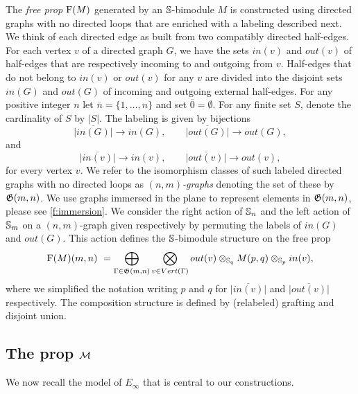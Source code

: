 The \textit{free prop} $\free(M)$ generated by an $\S$-bimodule $M$ is constructed using directed graphs with no directed loops that are enriched with a labeling described next.
We think of each directed edge as built from two compatibly directed half-edges.
For each vertex $v$ of a directed graph $G$, we have the sets $in(v)$ and $out(v)$ of half-edges that are respectively incoming to and outgoing from $v$.
Half-edges that do not belong to $in(v)$ or $out(v)$ for any $v$ are divided into the disjoint sets $in(G)$ and $out(G)$ of incoming and outgoing external half-edges.
For any positive integer $n$ let $\overline{n} = \{1, \dots, n\}$ and set $\overline{0} = \emptyset$.
For any finite set $S$, denote the cardinality of $S$ by $|S|$.
The labeling is given by bijections
\[
\overline{|in(G)|}\to in(G), \qquad
\overline{|out(G)|}\to out(G),
\]
and
\[
\overline{|in(v)|}\to in(v), \qquad
\overline{|out(v)|}\to out(v),
\]
for every vertex $v$.
We refer to the isomorphism classes of such labeled directed graphs with no directed loops as $(n,m)$\textit{-graphs} denoting the set of these by $\G(m,n)$.
We use graphs immersed in the plane to represent elements in $\G(m,n)$, please see \cref{f:immersion}.
We consider the right action of $\S_n$ and the left action of $\S_m$ on a $(n,m)$-graph given respectively by permuting the labels of $in(G)$ and $out(G)$.
This action defines the $\S$-bimodule structure on the free prop
\begin{equation} \label{e:free prop}
\free(M)(m,n) \ = \bigoplus_{\Gamma \in \G(m,n)} \bigotimes_{v \in Vert(\Gamma)} out(v) \otimes_{\S_q} M(p, q) \otimes_{\S_p} in(v),
\end{equation}
where we simplified the notation writing $p$ and $q$ for $\overline{|in(v)|}$ and $\overline{|out(v)|}$ respectively.
The composition structure is defined by (relabeled) grafting and disjoint union.

\subsection{The prop $\M$}

We now recall the model of $E_\infty$ that is central to our constructions.

